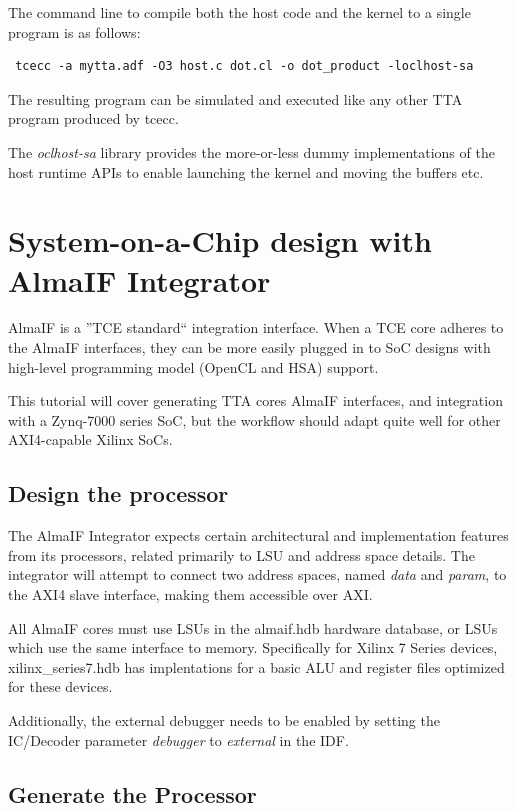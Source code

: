 \documentclass[twoside]{tceusermanual}
\begin{document}
The command line to compile both the host code and the kernel to
a single program is as follows:

\begin{verbatim}
 tcecc -a mytta.adf -O3 host.c dot.cl -o dot_product -loclhost-sa
\end{verbatim}

The resulting program can be simulated and executed like any 
other TTA program produced by tcecc.

The \textit{oclhost-sa} library provides the more-or-less dummy
implementations of the host runtime APIs to enable launching the
kernel and moving the buffers etc.

\section{System-on-a-Chip design with AlmaIF Integrator}

AlmaIF is a ''TCE standard`` integration interface. When a TCE core adheres
to the AlmaIF interfaces, they can be more easily plugged in to SoC designs with
high-level programming model (OpenCL and HSA) support.

This tutorial will cover generating TTA cores AlmaIF interfaces, and
integration with a Zynq-7000
series SoC, but the workflow should adapt quite well for other AXI4-capable
Xilinx SoCs.

\subsection{Design the processor}

The AlmaIF Integrator expects certain architectural and implementation features
from its processors, related primarily to LSU and address space details.
The integrator will attempt to connect two address spaces, named \textit{data}
and \textit{param}, to the AXI4 slave interface, making them accessible over
AXI.

All AlmaIF cores must use LSUs in the almaif.hdb hardware database, or LSUs
which use the same interface to memory. Specifically for Xilinx 7 Series
devices, xilinx\_series7.hdb has implentations for a basic ALU and register files
optimized for these devices.

Additionally, the external debugger needs to be enabled by setting the
IC/Decoder parameter \textit{debugger} to \textit{external} in the IDF.

\subsection{Generate the Processor}
\end{document}
